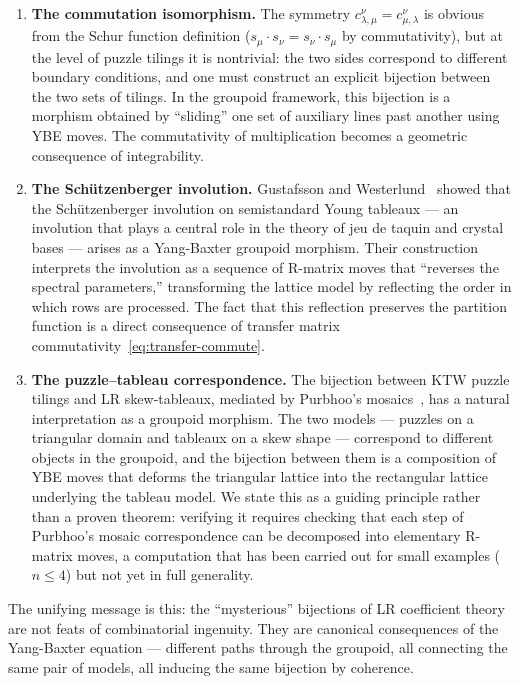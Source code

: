 \begin{enumerate}
\item \textbf{The commutation isomorphism.}  The symmetry
  $c^{\nu}_{\lambda,\mu} = c^{\nu}_{\mu,\lambda}$ is obvious from the
  Schur function definition ($s_\mu \cdot s_\nu = s_\nu \cdot s_\mu$
  by commutativity), but at the level of puzzle tilings it is
  nontrivial: the two sides correspond to different boundary
  conditions, and one must construct an explicit bijection between the
  two sets of tilings.  In the groupoid framework, this bijection is a
  morphism obtained by ``sliding'' one set of auxiliary lines past
  another using YBE moves.  The commutativity of multiplication
  becomes a geometric consequence of integrability.

\item \textbf{The Sch\"utzenberger involution.}
  Gustafsson and Westerlund~\cite{gustafsson-westerlund-2025} showed
  that the Sch\"utzenberger involution on semistandard Young
  tableaux --- an involution that plays a central role in the theory of
  jeu de taquin and crystal bases --- arises as a Yang-Baxter groupoid
  morphism.  Their construction interprets the involution as a sequence
  of R-matrix moves that ``reverses the spectral parameters,''
  transforming the lattice model by reflecting the order in which rows
  are processed.  The fact that this reflection preserves the
  partition function is a direct consequence of transfer matrix
  commutativity~\eqref{eq:transfer-commute}.

\item \textbf{The puzzle--tableau correspondence.}  The bijection
  between KTW puzzle tilings and LR skew-tableaux, mediated by
  Purbhoo's mosaics~\cite{purbhoo-2007}, has a natural interpretation
  as a groupoid morphism.  The two models --- puzzles on a triangular
  domain and tableaux on a skew shape --- correspond to different
  objects in the groupoid, and the bijection between them is
  a composition of YBE moves that deforms the triangular lattice into
  the rectangular lattice underlying the tableau model.  We state this
  as a guiding principle rather than a proven theorem: verifying it
  requires checking that each step of Purbhoo's mosaic
  correspondence can be decomposed into elementary R-matrix moves, a
  computation that has been carried out for small examples ($n \leq 4$)
  but not yet in full generality.
\end{enumerate}

The unifying message is this: the ``mysterious'' bijections of LR
coefficient theory are not feats of combinatorial ingenuity.  They are
canonical consequences of the Yang-Baxter equation --- different
paths through the groupoid, all connecting the same pair of models,
all inducing the same bijection by coherence.

